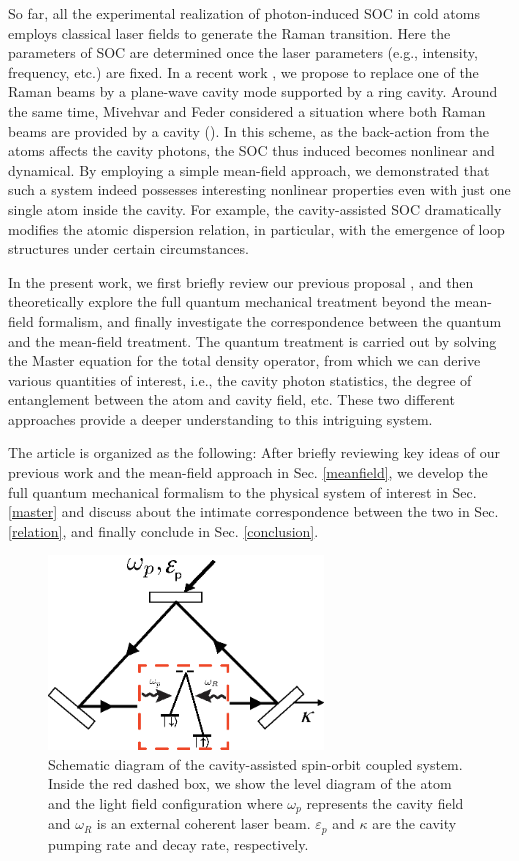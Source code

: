 \documentclass[atoms,article,submit,moreauthors,dvi2pdf,12pt,a4paper]{mdpi}
\begin{document}
So far, all the experimental realization of photon-induced SOC in cold atoms employs classical laser fields to generate the Raman transition. Here the parameters of SOC are determined once the laser parameters (e.g., intensity, frequency, etc.) are fixed. In a recent work \cite{cavitySOC}, we propose to replace one of the Raman beams by a plane-wave cavity mode supported by a ring cavity. Around the same time, Mivehvar and Feder considered a situation where both Raman beams are provided by a cavity (\cite{Feder}). In this scheme, as the back-action from the atoms affects the cavity photons, the SOC thus induced becomes nonlinear and dynamical. By employing a simple mean-field approach, we demonstrated \cite{cavitySOC} that such a system indeed possesses interesting nonlinear properties even with just one single atom inside the cavity. For example, the cavity-assisted SOC dramatically modifies the atomic dispersion relation, in particular, with the emergence of loop structures under certain circumstances.

In the present work, we first briefly review our previous proposal \cite{cavitySOC}, and then theoretically explore the full quantum mechanical treatment beyond the mean-field formalism, and finally investigate the correspondence between the quantum and the mean-field treatment. The quantum treatment is carried out by solving the Master equation for the total density operator, from which we can derive various quantities of interest, i.e., the cavity photon statistics, the degree of entanglement between the atom and cavity field, etc. These two different approaches provide a deeper understanding to this intriguing system.

The article is organized as the following: After briefly reviewing key ideas of our previous work and the mean-field approach in Sec. \ref{meanfield}, we develop the full quantum mechanical formalism to the physical system of interest in Sec. \ref{master} and discuss about the intimate correspondence between the two in Sec. \ref{relation}, and finally conclude in Sec. \ref{conclusion}.

\begin{figure}[htp]
\includegraphics[width=0.65\textwidth]{schematic}\caption{Schematic diagram of the cavity-assisted spin-orbit coupled system. Inside the red dashed box, we show the level diagram of the atom and the light field configuration where $\omega_p$ represents the cavity field and $\omega_R$ is an external coherent laser beam. $\varepsilon_p$ and $\kappa$ are the cavity pumping rate and decay rate, respectively.}\label{schematic}
\end{figure}
\end{document}
